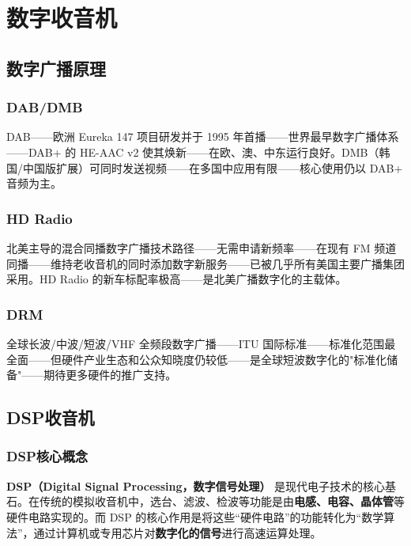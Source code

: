 \documentclass[12pt,UTF8]{ctexbook}
\begin{document}
\chapter{数字收音机}
\label{chap:digital_radio}

\section{数字广播原理}
\label{sec:digital_broadcast}

\subsection{DAB/DMB}

DAB——欧洲 Eureka 147 项目研发并于 1995 年首播——世界最早数字广播体系——DAB+ 的 HE-AAC v2 使其焕新——在欧、澳、中东运行良好。DMB（韩国/中国版扩展）可同时发送视频——在多国中应用有限——核心使用仍以 DAB+ 音频为主。

\subsection{HD Radio}

北美主导的混合同播数字广播技术路径——无需申请新频率——在现有 FM 频道同播——维持老收音机的同时添加数字新服务——已被几乎所有美国主要广播集团采用。HD Radio 的新车标配率极高——是北美广播数字化的主载体。

\subsection{DRM}

全球长波/中波/短波/VHF 全频段数字广播——ITU 国际标准——标准化范围最全面——但硬件产业生态和公众知晓度仍较低——是全球短波数字化的"标准化储备"——期待更多硬件的推广支持。

\section{DSP收音机}
\label{sec:dsp_radio}

\subsection{DSP核心概念}

\textbf{DSP（Digital Signal Processing，数字信号处理）} 是现代电子技术的核心基石。在传统的模拟收音机中，选台、滤波、检波等功能是由\textbf{电感、电容、晶体管}等硬件电路实现的。而 DSP 的核心作用是将这些“硬件电路”的功能转化为“数学算法”，通过计算机或专用芯片对\textbf{数字化的信号}进行高速运算处理。
\end{document}
